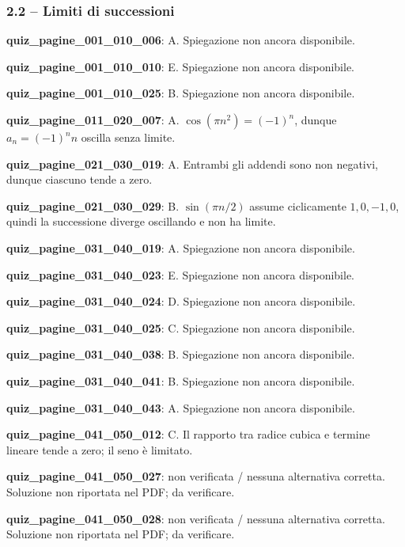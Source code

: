 \documentclass[11pt,a4paper]{article}
\newcounter{quiz}
\begin{document}
\subsubsection*{2.2 -- Limiti di successioni}
\noindent\textbf{quiz\_pagine\_001\_010\_006}: A. Spiegazione non ancora disponibile.\par\medskip
\noindent\textbf{quiz\_pagine\_001\_010\_010}: E. Spiegazione non ancora disponibile.\par\medskip
\noindent\textbf{quiz\_pagine\_001\_010\_025}: B. Spiegazione non ancora disponibile.\par\medskip
\noindent\textbf{quiz\_pagine\_011\_020\_007}: A. $\cos(\pi n^2)=(-1)^n$, dunque $a_n=(-1)^n n$ oscilla senza limite.\par\medskip
\noindent\textbf{quiz\_pagine\_021\_030\_019}: A. Entrambi gli addendi sono non negativi, dunque ciascuno tende a zero.\par\medskip
\noindent\textbf{quiz\_pagine\_021\_030\_029}: B. $\sin(\pi n/2)$ assume ciclicamente $1,0,-1,0$, quindi la successione diverge oscillando e non ha limite.\par\medskip
\noindent\textbf{quiz\_pagine\_031\_040\_019}: A. Spiegazione non ancora disponibile.\par\medskip
\noindent\textbf{quiz\_pagine\_031\_040\_023}: E. Spiegazione non ancora disponibile.\par\medskip
\noindent\textbf{quiz\_pagine\_031\_040\_024}: D. Spiegazione non ancora disponibile.\par\medskip
\noindent\textbf{quiz\_pagine\_031\_040\_025}: C. Spiegazione non ancora disponibile.\par\medskip
\noindent\textbf{quiz\_pagine\_031\_040\_038}: B. Spiegazione non ancora disponibile.\par\medskip
\noindent\textbf{quiz\_pagine\_031\_040\_041}: B. Spiegazione non ancora disponibile.\par\medskip
\noindent\textbf{quiz\_pagine\_031\_040\_043}: A. Spiegazione non ancora disponibile.\par\medskip
\noindent\textbf{quiz\_pagine\_041\_050\_012}: C. Il rapporto tra radice cubica e termine lineare tende a zero; il seno è limitato.\par\medskip
\noindent\textbf{quiz\_pagine\_041\_050\_027}: non verificata / nessuna alternativa corretta. Soluzione non riportata nel PDF; da verificare.\par\medskip
\noindent\textbf{quiz\_pagine\_041\_050\_028}: non verificata / nessuna alternativa corretta. Soluzione non riportata nel PDF; da verificare.\par\medskip
\end{document}
